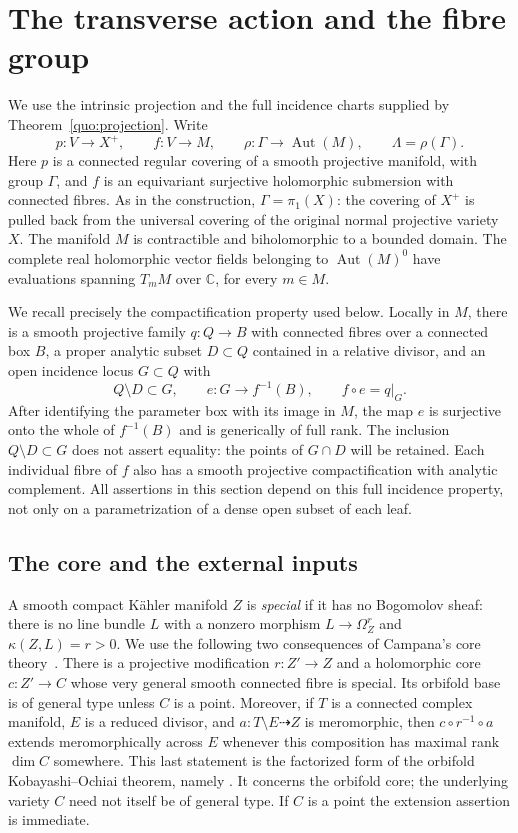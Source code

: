 \section{The transverse action and the fibre group}
\label{grp:section}

We use the intrinsic projection and the full incidence charts supplied by
Theorem~\ref{quo:projection}.  Write
\[
 p:V\longrightarrow X^+,\qquad f:V\longrightarrow M,
 \qquad \rho:\Gamma\longrightarrow\operatorname{Aut}(M),
 \qquad \Lambda=\rho(\Gamma).
\]
Here $p$ is a connected regular covering of a smooth projective manifold,
with group $\Gamma$, and $f$ is an equivariant surjective holomorphic
submersion with connected fibres.  As in the construction,
$\Gamma=\pi_1(X)$: the covering of $X^+$ is pulled back from the
universal covering of the original normal projective variety $X$.
The manifold $M$ is contractible and
biholomorphic to a bounded domain.  The complete real holomorphic vector
fields belonging to $\operatorname{Aut}(M)^0$ have evaluations spanning
$T_mM$ over $\mathbb C$, for every $m\in M$.

We recall precisely the compactification property used below.  Locally in
$M$, there is a smooth projective family $q:Q\to B$ with connected
fibres over a connected box $B$, a proper analytic
subset $D\subset Q$ contained in a relative divisor, and an open incidence
locus $G\subset Q$ with
\[
 Q\setminus D\subset G,
 \qquad e:G\longrightarrow f^{-1}(B),
 \qquad f\circ e=q|_G.
\]
After identifying the parameter box with its image in $M$, the map $e$
is surjective onto the whole of $f^{-1}(B)$ and is generically of full
rank.  The inclusion $Q\setminus D\subset G$ does not assert equality:
the points of $G\cap D$ will be retained.  Each individual fibre of $f$
also has a smooth projective compactification with analytic complement.
All assertions in this section depend on this full incidence property,
not only on a parametrization of a dense open subset of each leaf.

\subsection{The core and the external inputs}

A smooth compact K\"ahler manifold $Z$ is \emph{special} if it has no
Bogomolov sheaf: there is no line bundle $L$ with a nonzero morphism
$L\to\Omega_Z^r$ and $\kappa(Z,L)=r>0$.  We use the following two
consequences of Campana's core theory~\cite{Campana2004}.
There is a projective modification $r:Z'\to Z$ and a holomorphic core
$c:Z'\to C$ whose very general smooth connected fibre is special.
Its orbifold base is of general type unless $C$ is a point.  Moreover,
if $T$ is a connected complex manifold, $E$ is a reduced divisor, and
$a:T\setminus E\dashrightarrow Z$ is meromorphic, then
$c\circ r^{-1}\circ a$ extends meromorphically across $E$ whenever
this composition has maximal rank $\dim C$ somewhere.  This last
statement is the factorized form of the orbifold Kobayashi--Ochiai
theorem, namely \cite[Theorem~8.2]{Campana2004}.  It concerns the
orbifold core; the underlying variety $C$ need not itself be of general
type.  If $C$ is a point the extension assertion is immediate.

